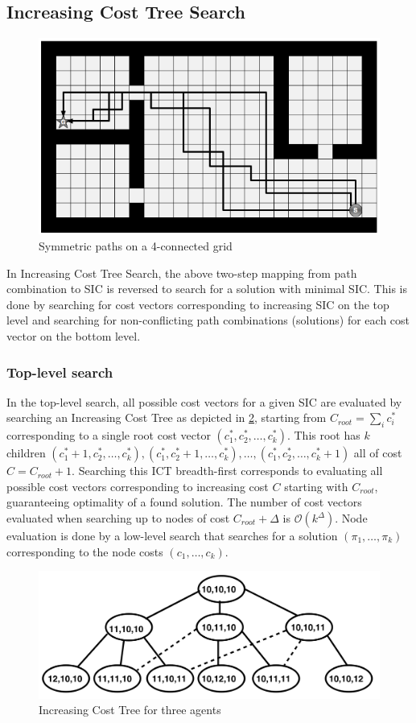 \documentclass[english]{article}
\begin{document}
	\subsection{Increasing Cost Tree Search}
	\label{icts}
	\begin{figure}[t]
		\centering
		\includegraphics[width=0.4\linewidth]{img/symmetries}
		\caption{Symmetric paths on a 4-connected grid\cite{harabor2010}}
		\label{fig:symmetries}
	\end{figure}
	In Increasing Cost Tree Search\cite{sharon2011}, the above two-step mapping from path combination to SIC is reversed to search for a solution with minimal SIC. This is done by searching for cost vectors corresponding to increasing SIC on the top level and searching for non-conflicting path combinations (solutions) for each cost vector on the bottom level. 
	
	\subsubsection{Top-level search}
	In the top-level search, all possible cost vectors for a given SIC are evaluated by searching an Increasing Cost Tree as depicted in \ref{fig:ict}, starting from $C_{root} = \sum_i c^*_i$ corresponding to a single root cost vector $(c^*_1,c^*_2,\ldots,c^*_k)$. This root has $k$ children $(c^*_1 + 1,c^*_2,\ldots,c^*_k),(c^*_1,c^*_2 + 1,\ldots,c^*_k),\ldots,(c^*_1,c^*_2,\ldots,c^*_k + 1)$ all of cost $C = C_{root} + 1$. Searching this ICT breadth-first corresponds to evaluating all possible cost vectors corresponding to increasing cost $C$ starting with $C_{root}$, guaranteeing optimality of a found solution. The number of cost vectors evaluated when searching up to nodes of cost $C_{root} + \Delta$ is $\mathcal{O}(k^\Delta)$. Node evaluation is done by a low-level search that searches for a solution $(\pi_1,\ldots,\pi_k)$ corresponding to the node costs $(c_1,\ldots,c_k)$.
	
	\begin{figure}[t]
		\centering
		\includegraphics[width=0.7\linewidth]{img/ict}
		\caption{Increasing Cost Tree for three agents \cite{sharon2011}}
		\label{fig:ict}
	\end{figure}
	\begin{figure}
		
	\end{figure}
	
\end{document}

